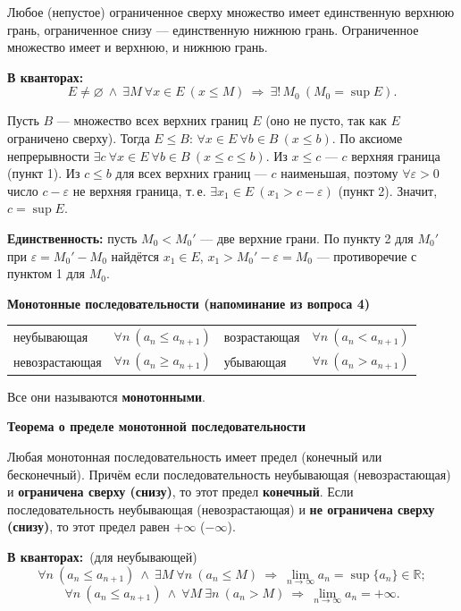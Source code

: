 \documentclass[a4paper,11pt]{article}
\newcommand{\R}{\mathbb{R}}
\newcommand{\eps}{\varepsilon}
\newcommand{\kv}{\par\noindent\textbf{\textcolor{oprc!85!black}{В кванторах:}}}
\newcommand{\podr}[1]{\par\needspace{8\baselineskip}\medskip
  {\large\bfseries\textcolor{oprc!80!black}{#1}}\par\nopagebreak\smallskip}
\begin{document}
\begin{teo}
Любое (непустое) ограниченное сверху множество имеет единственную верхнюю грань, ограниченное снизу --- единственную нижнюю грань.
Ограниченное множество имеет и верхнюю, и нижнюю грань.
\kv
\[
  E \ne \varnothing \ \wedge\ \exists M\ \forall x \in E\ (x \le M) \ \Longrightarrow\ \exists!\, M_0\ (M_0 = \sup E).
\]
\end{teo}

\begin{dop}
Пусть $B$ --- множество всех верхних границ $E$ (оно не пусто, так как $E$ ограничено сверху). Тогда $E \le B$:
$\forall x \in E\ \forall b \in B\ (x \le b)$. По аксиоме непрерывности $\exists c\ \forall x \in E\ \forall b \in B\ (x \le c \le b)$.
Из $x \le c$ --- $c$ верхняя граница (пункт 1). Из $c \le b$ для всех верхних границ --- $c$ наименьшая, поэтому
$\forall \eps > 0$ число $c - \eps$ не верхняя граница, т.\,е. $\exists x_1 \in E\ (x_1 > c - \eps)$ (пункт 2). Значит, $c = \sup E$.

\textbf{Единственность:} пусть $M_0 < M_0'$ --- две верхние грани. По пункту 2 для $M_0'$ при $\eps = M_0' - M_0$ найдётся
$x_1 \in E$, $x_1 > M_0' - \eps = M_0$ --- противоречие с пунктом 1 для $M_0$.
\end{dop}

\podr{Монотонные последовательности (напоминание из вопроса 4)}

\begin{center}
\renewcommand{\arraystretch}{1.25}
\begin{tabular}{|l|l||l|l|}
\hline
неубывающая & $\forall n\ (a_n \le a_{n+1})$ & возрастающая & $\forall n\ (a_n < a_{n+1})$ \\
невозрастающая & $\forall n\ (a_n \ge a_{n+1})$ & убывающая & $\forall n\ (a_n > a_{n+1})$ \\ \hline
\end{tabular}
\end{center}
Все они называются \textbf{монотонными}.

\podr{Теорема о пределе монотонной последовательности}

\begin{teo}
Любая монотонная последовательность имеет предел (конечный или бесконечный).
Причём если последовательность неубывающая (невозрастающая) и \textbf{ограничена сверху (снизу)}, то этот предел \textbf{конечный}.
Если последовательность неубывающая (невозрастающая) и \textbf{не ограничена сверху (снизу)}, то этот предел равен $+\infty$ ($-\infty$).
\kv\ (для неубывающей)
\[
  \forall n\ (a_n \le a_{n+1}) \ \wedge\ \exists M\ \forall n\ (a_n \le M) \ \Longrightarrow\ \lim_{n \to \infty} a_n = \sup\{a_n\} \in \R;
\]
\[
  \forall n\ (a_n \le a_{n+1}) \ \wedge\ \forall M\ \exists n\ (a_n > M) \ \Longrightarrow\ \lim_{n \to \infty} a_n = +\infty.
\]
\end{teo}
\end{document}
